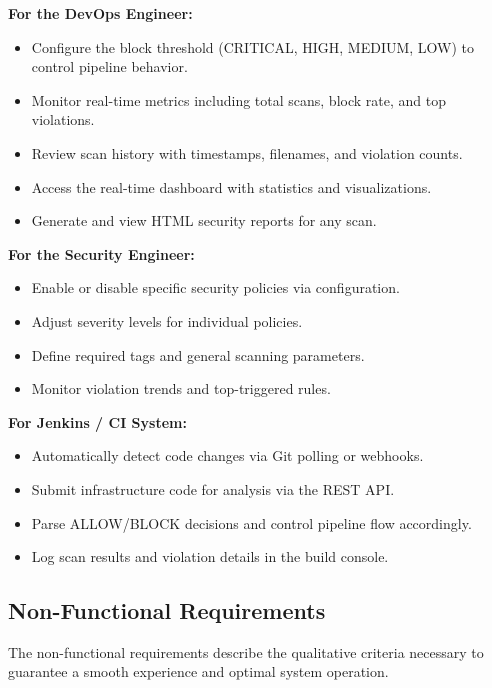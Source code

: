 \noindent\textbf{For the DevOps Engineer:}
\begin{itemize}
    \item Configure the block threshold (CRITICAL, HIGH, MEDIUM, LOW) to control pipeline behavior.
    \item Monitor real-time metrics including total scans, block rate, and top violations.
    \item Review scan history with timestamps, filenames, and violation counts.
    \item Access the real-time dashboard with statistics and visualizations.
    \item Generate and view HTML security reports for any scan.
\end{itemize}

\noindent\textbf{For the Security Engineer:}
\begin{itemize}
    \item Enable or disable specific security policies via configuration.
    \item Adjust severity levels for individual policies.
    \item Define required tags and general scanning parameters.
    \item Monitor violation trends and top-triggered rules.
\end{itemize}

\noindent\textbf{For Jenkins / CI System:}
\begin{itemize}
    \item Automatically detect code changes via Git polling or webhooks.
    \item Submit infrastructure code for analysis via the REST API.
    \item Parse ALLOW/BLOCK decisions and control pipeline flow accordingly.
    \item Log scan results and violation details in the build console.
\end{itemize}

\subsection{Non-Functional Requirements}

The non-functional requirements describe the qualitative criteria necessary to guarantee a smooth experience and optimal system operation.

